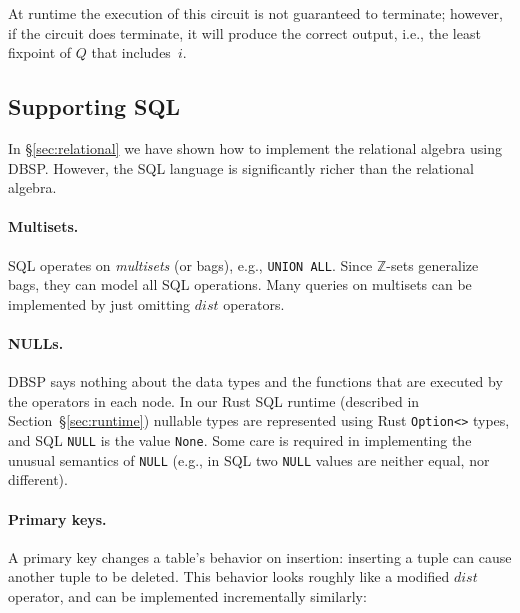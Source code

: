 \documentclass[twocolumn
]{svjour3}
\numberwithin{equation}{section}
\newcommand{\dbsp}{DBSP\xspace}
\newcommand{\zrs}{$\Z$-sets\xspace} %
\newcommand{\code}[1]{\mbox{\texttt{#1}}}
\newcommand{\Z}{\mathbb{Z}}  %
\newcommand{\zm}{\ensuremath{z^{-1}}} %
\newcommand{\I}{\mathcal{I}}  %
\newcommand{\I}{\mathit{I}}  %
\newcommand{\distinct}{\mathit{dist}}  %
\newcommand{\secref}[1]{\S\ref{#1}}  %
\newcommand{\refsec}[1]{\secref{#1}}
\begin{document}
At runtime the execution of this circuit is not guaranteed to terminate;
however, if the circuit does terminate, it will produce the correct
output, i.e., the least fixpoint of $Q$ that includes~$i$.

\subsection{Supporting SQL}\label{sec:sql}

In \secref{sec:relational} we have shown how to implement the
relational algebra using \dbsp.  However, the SQL language is
significantly richer than the relational algebra.

\paragraph{Multisets.} SQL operates on \emph{multisets} (or bags), e.g.,
\code{UNION ALL}.  Since \zrs generalize bags, they can model all SQL
operations. Many queries on multisets can be implemented by just
omitting $\distinct$ operators.

\paragraph{NULLs.} \dbsp says nothing about the data types
and the functions that are executed by the operators in each node.  In
our Rust SQL runtime (described in Section~\refsec{sec:runtime})
nullable types are represented using Rust \texttt{Option<>} types, and
SQL \code{NULL} is the value \code{None}.  Some care is required in
implementing the unusual semantics of \code{NULL} (e.g., in SQL two
\code{NULL} values are neither equal, nor different).

\paragraph{Primary keys.} A primary key changes a table's behavior on insertion:
inserting a tuple can cause another tuple to be deleted.  This
behavior looks roughly like a modified $\distinct$ operator, and can
be implemented incrementally similarly:

\begin{center}
\end{center}
\end{document}
